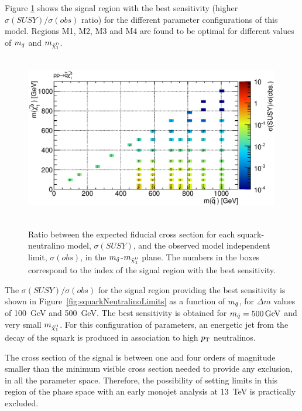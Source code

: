 Figure \ref{fig:squarkNeutralinoBestRegion} shows the signal region with the best sensitivity (higher $\sigma (SUSY) / \sigma (obs)$ ratio) for the different parameter configurations of this model.
Regions M1, M2, M3 and M4 are found to be optimal for different values of $m_{\tilde{q}}$ and $m_{\ninoone}$.

\begin{figure}[!ht]
\begin{center}
\mbox{
\includegraphics[width=0.995\textwidth]{Interpretations/Figures/sq_neu_best.eps}
}
\end{center}
\caption[Ratio between the expected fiducial cross section for each squark-neutralino model, $\sigma (SUSY)$, and the observed model independent limit.]{Ratio between the expected fiducial cross section for each squark-neutralino model, $\sigma (SUSY)$, and the observed model independent limit, $\sigma (obs)$, in the $m_{\tilde{q}}$-$m_{\ninoone}$ plane. The numbers in the boxes correspond to the index of the signal region with the best sensitivity.}
\label{fig:squarkNeutralinoBestRegion}
\end{figure}

The $\sigma (SUSY) / \sigma (obs)$ for the signal region providing the best sensitivity is shown in Figure~\ref{fig:squarkNeutralinoLimits} as a function of $m_{\tilde{q}}$, for $\Delta m$ values of 100~GeV and 500~GeV.
The best sensitivity is obtained for $m_{\squark} = \unit[500]{GeV}$ and very small $m_{\ninoone}$.
For this configuration of parameters, an energetic jet from the decay of the squark is produced in association to high $p_{\mathrm{T}}$ neutralinos.

The cross section of the signal is between one and four orders of magnitude smaller than the minimum visible cross section needed to provide any exclusion, in all the parameter space.
Therefore, the possibility of setting limits in this region of the phase space with an early monojet analysis at 13~TeV is practically excluded.

